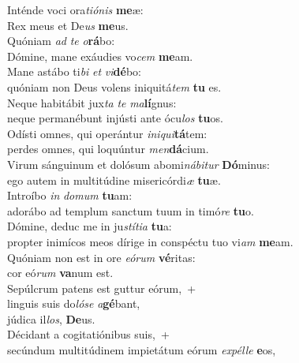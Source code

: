 \evenverse Inténde voci ora\textit{ti}\textit{ó}\textit{nis} \textbf{me}æ:~\*\\
\evenverse Rex meus et De\textit{us} \textbf{me}us.\\
\oddverse Quóniam \textit{ad} \textit{te} \textit{o}\textbf{rá}bo:~\*\\
\oddverse Dómine, mane exáudies vo\textit{cem} \textbf{me}am.\\
\evenverse Mane astábo ti\textit{bi} \textit{et} \textit{vi}\textbf{dé}bo:~\*\\
\evenverse quóniam non Deus volens iniquitá\textit{tem} \textbf{tu} es.\\
\oddverse Neque habitábit jux\textit{ta} \textit{te} \textit{ma}\textbf{lí}gnus:~\*\\
\oddverse neque permanébunt injústi ante ócu\textit{los} \textbf{tu}os.\\
\evenverse Odísti omnes, qui operántur \textit{i}\textit{ni}\textit{qui}\textbf{tá}tem:~\*\\
\evenverse perdes omnes, qui loquúntur \textit{men}\textbf{dá}cium.\\
\oddverse Virum sánguinum et dolósum abomi\textit{ná}\textit{bi}\textit{tur} \textbf{Dó}minus:~\*\\
\oddverse ego autem in multitúdine misericórdi\textit{æ} \textbf{tu}æ.\\
\evenverse Introíbo \textit{in} \textit{do}\textit{mum} \textbf{tu}am:~\*\\
\evenverse adorábo ad templum sanctum tuum in timó\textit{re} \textbf{tu}o.\\
\oddverse Dómine, deduc me in ju\textit{stí}\textit{ti}\textit{a} \textbf{tu}a:~\*\\
\oddverse propter inimícos meos dírige in conspéctu tuo vi\textit{am} \textbf{me}am.\\
\evenverse Quóniam non est in ore \textit{e}\textit{ó}\textit{rum} \textbf{vé}ritas:~\*\\
\evenverse cor eó\textit{rum} \textbf{va}num est.\\
\oddverse Sepúlcrum patens est guttur eórum,~+\\
\oddverse  linguis suis do\textit{ló}\textit{se} \textit{a}\textbf{gé}bant,~\*\\
\oddverse júdica il\textit{los}, \textbf{De}us.\\
\evenverse Décidant a cogitatiónibus suis,~+\\
\evenverse  secúndum multitúdinem impietátum eórum \textit{ex}\textit{pél}\textit{le} \textbf{e}os,~\*\\
